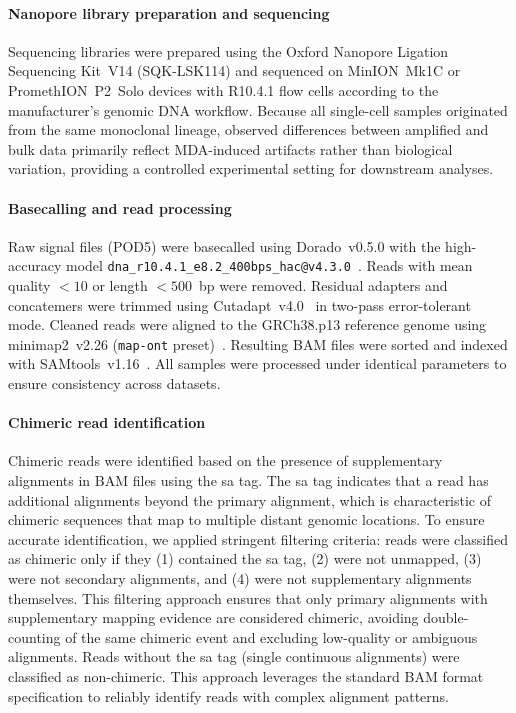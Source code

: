 \documentclass[pdflatex,sn-nature]{sn-jnl}%
\theoremstyle{thmstyleone}%
\theoremstyle{thmstyletwo}%
\theoremstyle{thmstylethree}%
\begin{document}
\paragraph{Nanopore library preparation and sequencing}
Sequencing libraries were prepared using the Oxford Nanopore Ligation Sequencing Kit~V14 (SQK-LSK114) and sequenced on MinION~Mk1C or PromethION~P2~Solo devices with R10.4.1 flow cells according to the manufacturer's genomic DNA workflow. Because all single-cell samples originated from the same monoclonal lineage, observed differences between amplified and bulk data primarily reflect MDA-induced artifacts rather than biological variation, providing a controlled experimental setting for downstream analyses.

\paragraph{Basecalling and read processing}

Raw signal files (POD5) were basecalled using Dorado~v0.5.0 with the high-accuracy model \texttt{dna\_r10.4.1\_e8.2\_400bps\_hac@v4.3.0}~\cite{dorado2023}. Reads with mean quality $< 10$ or length $< 500$~bp were removed. Residual adapters and concatemers were trimmed using Cutadapt~v4.0~\cite{martin2011cutadapt} in two-pass error-tolerant mode. Cleaned reads were aligned to the GRCh38.p13 reference genome using minimap2~v2.26 (\texttt{map-ont} preset)~\cite{li2018minimap2}. Resulting BAM files were sorted and indexed with SAMtools~v1.16~\cite{danecek2021twelve}. All samples were processed under identical parameters to ensure consistency across datasets.

\paragraph{Chimeric read identification}
Chimeric reads were identified based on the presence of supplementary alignments in BAM files using the \gls{sa} tag.
The \gls{sa} tag indicates that a read has additional alignments beyond the primary alignment, which is characteristic of chimeric sequences that map to multiple distant genomic locations.
To ensure accurate identification, we applied stringent filtering criteria: reads were classified as chimeric only if they (1) contained the \gls{sa} tag, (2) were not unmapped, (3) were not secondary alignments, and (4) were not supplementary alignments themselves.
This filtering approach ensures that only primary alignments with supplementary mapping evidence are considered chimeric, avoiding double-counting of the same chimeric event and excluding low-quality or ambiguous alignments.
Reads without the \gls{sa} tag (single continuous alignments) were classified as non-chimeric.
This approach leverages the standard BAM format specification to reliably identify reads with complex alignment patterns.
\end{document}
